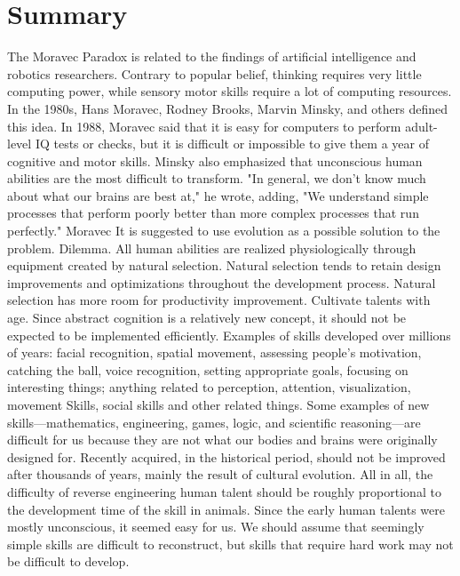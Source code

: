 \documentclass{article}
\begin{document}
\section{Summary}
The Moravec Paradox is related to the findings of artificial intelligence and robotics researchers. Contrary to popular belief, thinking requires very little computing power, while sensory motor skills require a lot of computing resources.  In the 1980s, Hans Moravec, Rodney Brooks, Marvin Minsky, and others defined this idea. In 1988, Moravec said that it is easy for computers to perform adult-level IQ tests or checks, but it is difficult or impossible to give them a year of cognitive and motor skills.  Minsky also emphasized that unconscious human abilities are the most difficult to transform. "In general, we don't know much about what our brains are best at," he wrote, adding, "We understand simple processes that perform poorly better than more complex processes that run perfectly."  Moravec It is suggested to use evolution as a possible solution to the problem. Dilemma. All human abilities are realized physiologically through equipment created by natural selection. Natural selection tends to retain design improvements and optimizations throughout the development process. Natural selection has more room for productivity improvement. Cultivate talents with age. Since abstract cognition is a relatively new concept, it should not be expected to be implemented efficiently.  Examples of skills developed over millions of years: facial recognition, spatial movement, assessing people’s motivation, catching the ball, voice recognition, setting appropriate goals, focusing on interesting things; anything related to perception, attention, visualization, movement Skills, social skills and other related things.  Some examples of new skills—mathematics, engineering, games, logic, and scientific reasoning—are difficult for us because they are not what our bodies and brains were originally designed for. Recently acquired, in the historical period, should not be improved after thousands of years, mainly the result of cultural evolution.   All in all, the difficulty of reverse engineering human talent should be roughly proportional to the development time of the skill in animals. Since the early human talents were mostly unconscious, it seemed easy for us. We should assume that seemingly simple skills are difficult to reconstruct, but skills that require hard work may not be difficult to develop.
\end{document}
